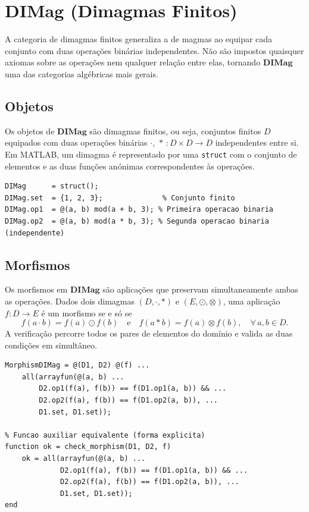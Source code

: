 \section{DIMag (Dimagmas Finitos)}
A categoria de dimagmas finitos generaliza a de magmas ao equipar cada conjunto com duas operações binárias independentes. Não são impostos quaisquer axiomas sobre as operações nem qualquer relação entre elas, tornando $\mathbf{DIMag}$ uma das categorias algébricas mais gerais.

\subsection{Objetos}
Os objetos de $\mathbf{DIMag}$ são dimagmas finitos, ou seja, conjuntos finitos $D$ equipados com duas operações binárias $\cdot,\, \ast\,: D \times D \to D$ independentes entre si. Em MATLAB, um dimagma é representado por uma \texttt{struct} com o conjunto de elementos e as duas funções anónimas correspondentes às operações.

\begin{lstlisting}[caption={Representação de um dimagma finito}]
% Definicao de um dimagma: conjunto {1,2,3} com duas operacoes
DIMag      = struct();
DIMag.set  = {1, 2, 3};              % Conjunto finito
DIMag.op1  = @(a, b) mod(a + b, 3); % Primeira operacao binaria
DIMag.op2  = @(a, b) mod(a * b, 3); % Segunda operacao binaria (independente)
\end{lstlisting}

\subsection{Morfismos}
Os morfismos em $\mathbf{DIMag}$ são aplicações que preservam simultaneamente ambas as operações. Dados dois dimagmas $(D, \cdot, \ast)$ e $(E, \odot, \otimes)$, uma aplicação $f: D \to E$ é um morfismo se e só se
\[
    f(a \cdot b) = f(a) \odot f(b)
    \quad \text{e} \quad
    f(a \ast b) = f(a) \otimes f(b), \quad \forall\, a, b \in D.
\]
A verificação percorre todos os pares de elementos do domínio e valida as duas condições em simultâneo.

\begin{lstlisting}[caption={Verificação de morfismo entre dimagmas}]
% Construtor de verificador de morfismo entre dois dimagmas D1 e D2
MorphismDIMag = @(D1, D2) @(f) ...
    all(arrayfun(@(a, b) ...
        D2.op1(f(a), f(b)) == f(D1.op1(a, b)) && ...
        D2.op2(f(a), f(b)) == f(D1.op2(a, b)), ...
        D1.set, D1.set));

% Funcao auxiliar equivalente (forma explicita)
function ok = check_morphism(D1, D2, f)
    ok = all(arrayfun(@(a, b) ...
             D2.op1(f(a), f(b)) == f(D1.op1(a, b)) && ...
             D2.op2(f(a), f(b)) == f(D1.op2(a, b)), ...
             D1.set, D1.set));
end
\end{lstlisting}
